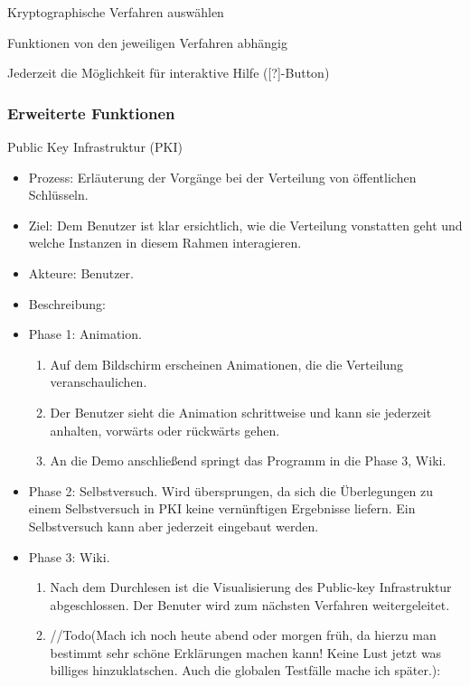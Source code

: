 \documentclass{article}
\begin{document}
\begin{FA}[start=200]
\item Kryptographische Verfahren auswählen
\end{FA}

\begin{FA}[start=300]
\item Funktionen von den jeweiligen Verfahren abhängig
\end{FA}

\begin{FA}[start=400]
\item Jederzeit die Möglichkeit für interaktive Hilfe ([?]-Button)
\end{FA}

\subsubsection{Erweiterte Funktionen}

\begin{FA}[start=500]
\item Public Key Infrastruktur (PKI)
\end{FA}
\begin{itemize}[label={}]
\item Prozess: Erläuterung der Vorgänge bei der Verteilung von öffentlichen Schlüsseln.
\item Ziel: Dem Benutzer ist klar ersichtlich, wie die Verteilung vonstatten geht und welche Instanzen in diesem Rahmen interagieren.
\item Akteure: Benutzer.
\item Beschreibung:
\item Phase 1: Animation.
\begin{enumerate}
\item Auf dem Bildschirm erscheinen Animationen, die die Verteilung veranschaulichen.
\item Der Benutzer sieht die Animation schrittweise und kann sie jederzeit anhalten, vorwärts oder rückwärts gehen.
\item An die Demo anschließend springt das Programm in die Phase 3, Wiki. 
\end{enumerate}
\item Phase 2: Selbstversuch. Wird übersprungen, da sich die Überlegungen zu einem Selbstversuch in PKI keine vernünftigen Ergebnisse liefern. Ein Selbstversuch kann aber jederzeit eingebaut werden.
\item Phase 3: Wiki.
\begin{enumerate}
\item Nach dem Durchlesen ist die Visualisierung des Public-key Infrastruktur abgeschlossen. Der Benuter wird zum nächsten Verfahren weitergeleitet.
\item //Todo(Mach ich noch heute abend oder morgen früh, da hierzu man bestimmt sehr schöne Erklärungen machen kann! Keine Lust jetzt was billiges hinzuklatschen. Auch die globalen Testfälle mache ich später.):
\end{enumerate}
\end{itemize}
\end{document}

